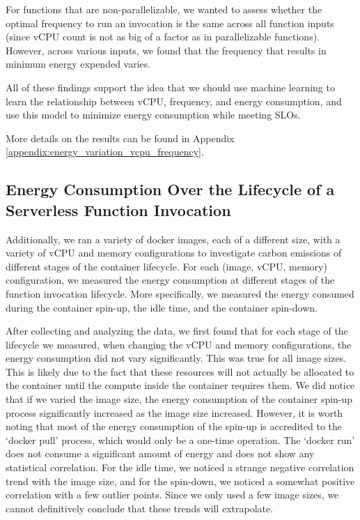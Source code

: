 \documentclass[times, 10pt,twocolumn]{article}
\begin{document}
For functions that are non-parallelizable, we wanted to assess whether the optimal frequency to run an invocation is the same across all function inputs (since vCPU count is not as big of a factor as in parallelizable functions). However, across various inputs, we found that the frequency that results in minimum energy expended varies. 

All of these findings support the idea that we should use machine learning to learn the relationship between vCPU, frequency, and energy consumption, and use this model to minimize energy consumption while meeting SLOs.

More details on the results can be found in Appendix \ref{appendix:energy_variation_vcpu_frequency}.

\subsection{Energy Consumption Over the Lifecycle of a Serverless Function Invocation}
Additionally, we ran a variety of docker images, each of a different size, with a variety of vCPU and memory configurations to investigate carbon emissions of different stages of the container lifecycle. For each (image, vCPU, memory) configuration, we measured the energy consumption at different stages of the function invocation lifecycle. More specifically, we measured the energy consumed during the container spin-up, the idle time, and the container spin-down.

After collecting and analyzing the data, we first found that for each stage of the lifecycle we measured, when changing the vCPU and memory configurations, the energy consumption did not vary significantly. This was true for all image sizes. This is likely due to the fact that these resources will not actually be allocated to the container until the compute inside the container requires them. We did notice that if we varied the image size, the energy consumption of the container spin-up process significantly increased as the image size increased. However, it is worth noting that most of the energy consumption of the spin-up is accredited to the `docker pull' process, which would only be a one-time operation. The `docker run' does not consume a significant amount of energy and does not show any statistical correlation. For the idle time, we noticed a strange negative correlation trend with the image size, and for the spin-down, we noticed a somewhat positive correlation with a few outlier points. Since we only used a few image sizes, we cannot definitively conclude that these trends will extrapolate.
\end{document}
